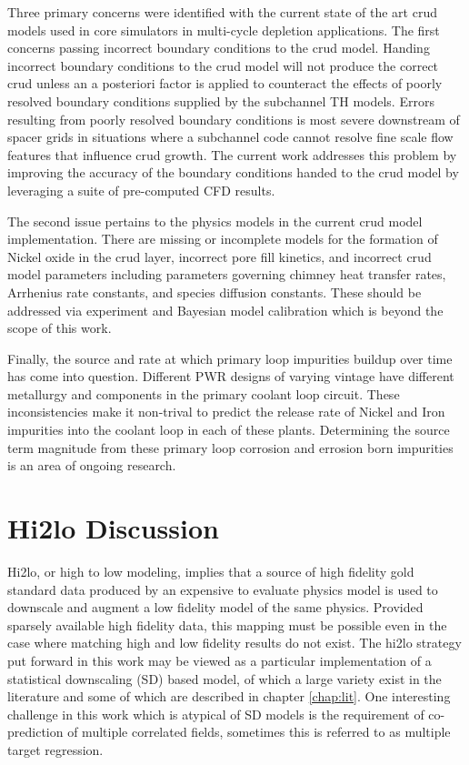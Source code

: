 Three primary concerns were identified with the current state of the art crud models used in core simulators in multi-cycle depletion applications.
The first concerns passing incorrect boundary conditions to the crud model.  Handing incorrect boundary conditions to the crud model will not produce the correct crud unless an a posteriori factor is applied to counteract the effects of poorly resolved boundary conditions supplied by the subchannel TH models.  Errors resulting from poorly resolved boundary conditions is most severe downstream of spacer grids in situations where a subchannel code cannot resolve fine scale flow features that influence crud growth.  The current work addresses this problem by improving the accuracy of the boundary conditions handed to the crud model by leveraging a suite of pre-computed CFD results.

The second issue pertains to the physics models in the current crud model implementation.  There are missing or incomplete models for the formation of Nickel oxide in the crud layer, incorrect pore fill kinetics, and incorrect crud model parameters including parameters governing chimney heat transfer rates, Arrhenius rate constants, and species diffusion constants. These should be addressed via experiment and Bayesian model calibration which is beyond the scope of this work.

Finally, the source and rate at which primary loop impurities buildup over time has come into question.  Different PWR designs of varying vintage have different metallurgy and components in the primary coolant loop circuit.  These inconsistencies make it non-trival to predict the release rate of Nickel and Iron impurities into the coolant loop in each of these plants.  Determining the source term magnitude from these primary loop corrosion and errosion born impurities is an area of ongoing research.



\section{Hi2lo Discussion}

Hi2lo, or high to low modeling, implies that a source of high fidelity gold standard data produced by an expensive to evaluate physics model is used to downscale and augment a low fidelity model of the same physics.
Provided sparsely available high fidelity data, this mapping must be possible even in the case where matching high and low fidelity results do not exist.  The hi2lo strategy put forward in this work may be viewed as a particular implementation of a statistical downscaling (SD) based model, of which a large variety exist in the literature and some of which are described in chapter \ref{chap:lit}.  One interesting challenge in this work which is atypical of SD models is the requirement of co-prediction of multiple correlated fields, sometimes this is referred to as multiple target regression.

